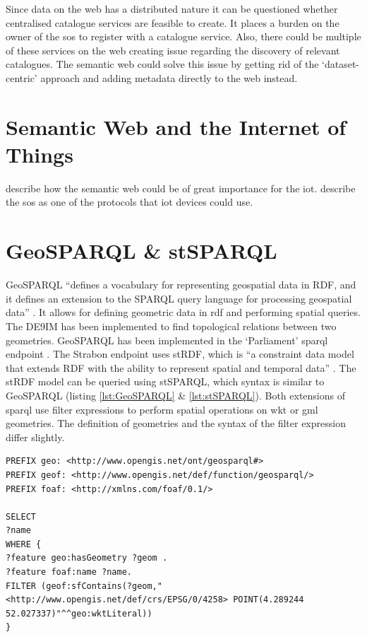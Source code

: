 Since data on the web has a distributed nature it can be questioned whether centralised catalogue services are feasible to create. It places a burden on the owner of the \ac{sos} to register with a catalogue service. Also, there could be multiple of these services on the web creating issue regarding the discovery of relevant catalogues. The semantic web could solve this issue by getting rid of the `dataset-centric' approach and adding metadata directly to the web instead.

\section{Semantic Web and the Internet of Things}
\cite{IOT:Barnaghi} describe how the semantic web could be of great importance for the \ac{iot}.
\cite{IOT:Jazayeri} describe the \ac{sos} as one of the protocols that \ac{iot} devices could use.

\section{GeoSPARQL \& stSPARQL}
\label{par:SpatialFilters}
GeoSPARQL \enquote{defines a vocabulary for representing geospatial data in RDF, and it defines an extension to the SPARQL query language for processing geospatial data} \cite[p. xvi]{LD:OGC}. It allows for defining geometric data in \ac{rdf} and performing spatial queries. The \ac{DE9IM} \citep{GIS:9IM} has been implemented to find topological relations between two geometries. GeoSPARQL has been implemented in the `Parliament' \ac{sparql} endpoint \citep{LD:GeoSPARQL}. The Strabon endpoint uses stRDF, which is \enquote{a constraint data model that extends RDF with the ability to represent spatial and temporal data} \cite[p. 425]{SSW:Koubarakis}. The stRDF model can be queried using stSPARQL, which syntax is similar to GeoSPARQL (listing \ref{lst:GeoSPARQL} \& \ref{lst:stSPARQL}). Both extensions of \ac{sparql} use filter expressions to perform spatial operations on \ac{wkt} or \ac{gml} geometries. The definition of geometries and the syntax of the filter expression differ slightly.

\begin{lstlisting}[caption={A GeoSPARQL query to find the names of features that contain a point geometry}, label={lst:GeoSPARQL}]
PREFIX geo: <http://www.opengis.net/ont/geosparql#>
PREFIX geof: <http://www.opengis.net/def/function/geosparql/>
PREFIX foaf: <http://xmlns.com/foaf/0.1/> 

SELECT 
?name
WHERE {
?feature geo:hasGeometry ?geom .
?feature foaf:name ?name.
FILTER (geof:sfContains(?geom,"<http://www.opengis.net/def/crs/EPSG/0/4258> POINT(4.289244 52.027337)"^^geo:wktLiteral))
}
\end{lstlisting}

